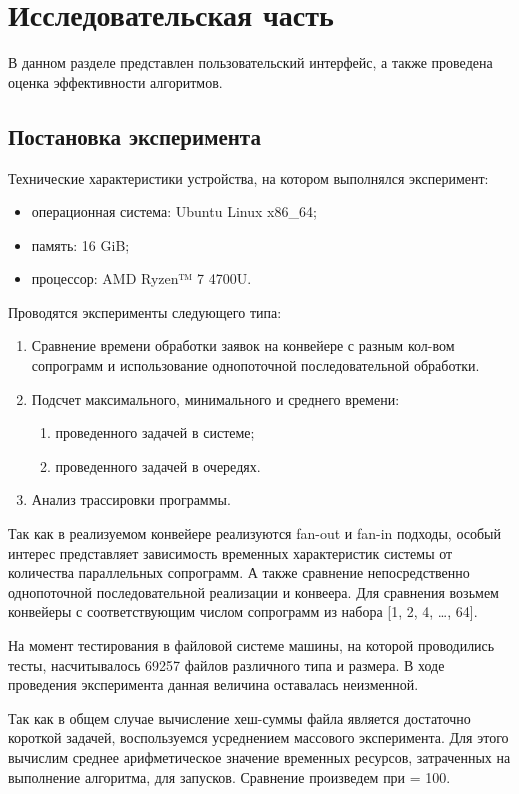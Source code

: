 \chapter{Исследовательская часть}

В данном разделе представлен пользовательский интерфейс, а
также проведена оценка эффективности алгоритмов.


\section{Постановка эксперимента}

Технические характеристики устройства, на котором выполнялся эксперимент:
\begin{itemize}
	\item операционная система: Ubuntu\cite{ubuntu} Linux x86\_64;
	\item память: 16 GiB;
	\item процессор: AMD Ryzen™ 7 4700U\cite{amd}.
\end{itemize}

Проводятся эксперименты следующего типа:
\begin{enumerate}
	\item Сравнение времени обработки заявок на конвейере с разным 
	кол-вом сопрограмм и использование однопоточной последовательной обработки.
	\item Подсчет максимального, минимального и среднего времени:
	\begin{enumerate}
		\item проведенного задачей в системе;
		\item проведенного задачей в очередях.
	\end{enumerate}
	\item Анализ трассировки программы.
\end{enumerate}


Так как в реализуемом конвейере реализуются fan-out и fan-in подходы, особый интерес представляет 
зависимость временных характеристик системы от количества параллельных сопрограмм. А также 
сравнение непосредственно однопоточной последовательной реализации и конвеера. 
Для сравнения возьмем конвейеры с соответствующим числом сопрограмм из набора [1, 2, 4, …, 64].

На момент тестирования в файловой системе машины, на которой проводились тесты,
насчитывалось 69257 файлов различного типа и размера. В ходе проведения эксперимента 
данная величина оставалась неизменной.

Так как в общем случае вычисление хеш-суммы файла является достаточно короткой задачей, 
воспользуемся усреднением массового эксперимента. Для этого вычислим среднее
арифметическое значение временных ресурсов, затраченных на выполнение алгоритма, для
 запусков. Сравнение произведем при  = 100.



